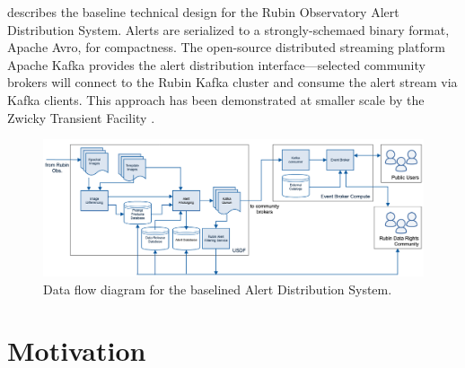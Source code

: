 \documentclass[DM,authoryear,toc]{lsstdoc}
\begin{document}
 describes the baseline technical design for the Rubin Observatory Alert Distribution System.
Alerts are serialized to a strongly-schemaed binary format, Apache Avro, for compactness.
The open-source distributed streaming platform Apache Kafka provides the alert distribution interface---selected community brokers will connect to the Rubin Kafka cluster and consume the alert stream via Kafka clients.
This approach has been demonstrated at smaller scale by the Zwicky Transient Facility \citep{Patterson:19:ZTFAlertDistribution}.


\begin{figure}
  \begin{centering}
  \includegraphics[width=\textwidth]{fig/baseline_alert_dist.png}
  \caption{Data flow diagram for the baselined Alert Distribution System. 
  \label{fig:baseline}}
  \end{centering}
\end{figure}


\section{Motivation}
\end{document}

